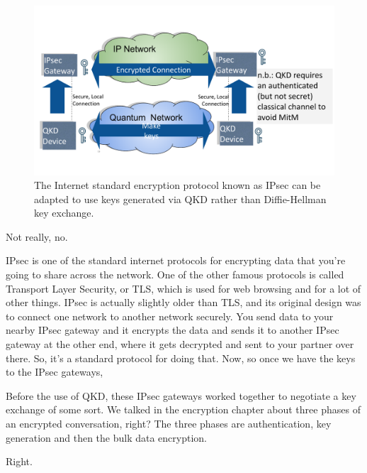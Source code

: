 \begin{figure}[t]
    \centering
    \includegraphics[width=1\textwidth]{lesson15/R2L15fig4.pdf}
    \caption[IPsec with QKD]{The Internet standard encryption protocol known as IPsec can be adapted to use keys generated via QKD rather than Diffie-Hellman key exchange.}
    \label{fig:15-4-ipsec-with-qkd}
\end{figure}

\mmm Not really, no.

\rrr IPsec is one of the standard internet protocols for encrypting data that you're going to share across the network. One of the other famous protocols is called Transport Layer Security, or TLS, which is used for web browsing and for a lot of other things. IPsec is actually slightly older than TLS, and its original design was to connect one network to another network securely. You send data to your nearby IPsec gateway and it encrypts the data and sends it to another IPsec gateway at the other end, where it gets decrypted and sent to your partner over there. So, it's a standard protocol for doing that. Now, so once we have the keys to the IPsec gateways,

Before the use of QKD, these IPsec gateways worked together to negotiate a key exchange of some sort. We talked in the encryption chapter about three phases of an encrypted conversation, right? The three phases are authentication, key generation and then the bulk data encryption.

\mmm Right.

